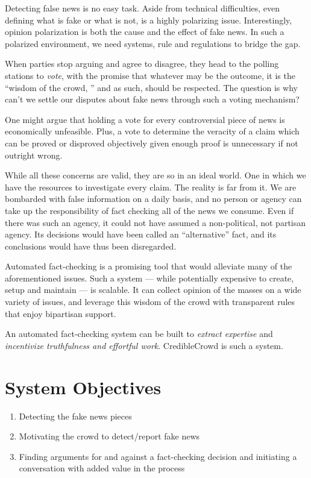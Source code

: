 \documentclass{report}
\theoremstyle{definition}
\begin{document}
Detecting false news is no easy task. Aside from technical difficulties, even defining what is fake or what is not, is a highly polarizing issue. Interestingly, opinion polarization is both the cause and the effect of fake news. In such a polarized environment, we need systems, rule and regulations to bridge the gap.

When parties stop arguing and agree to disagree, they head to the polling stations to \emph{vote}, with the promise that whatever may be the outcome, it is the ``wisdom of the crowd, '' and as such, should be respected. The question is why can't we settle our disputes about fake news through such a voting mechanism?

One might argue that holding a vote for every controversial piece of  news is economically unfeasible. Plus, a vote to determine the veracity of a claim which can be proved or disproved objectively given enough proof is unnecessary if not outright wrong.

While all these concerns are valid, they are so in an ideal world. One in which we have the resources to investigate every claim. The reality is far from it. We are bombarded with false information on a daily basis, and no person or agency can take up the responsibility of fact checking all of the news we consume. Even if there was such an agency, it could not have assumed a non-political, not partisan agency. Its decisions would have been called an ``alternative'' fact, and its conclusions would have thus been disregarded.

Automated fact-checking is a promising tool that would alleviate many of the aforementioned issues. Such a system --- while potentially expensive to create, setup and maintain --- is scalable. It can collect opinion of the masses on a wide variety of issues, and leverage this wisdom of the crowd with transparent rules that enjoy bipartisan support.

An automated fact-checking system can be built to \emph{extract expertise} and \emph{incentivize truthfulness and effortful work}. CredibleCrowd is such a system. 

\section{System Objectives}
\begin{enumerate}
    \item Detecting the fake news pieces
    \item Motivating the crowd to detect/report fake news
    \item Finding arguments for and against a fact-checking decision and initiating a conversation with added value in the process
\end{enumerate}
\end{document}
